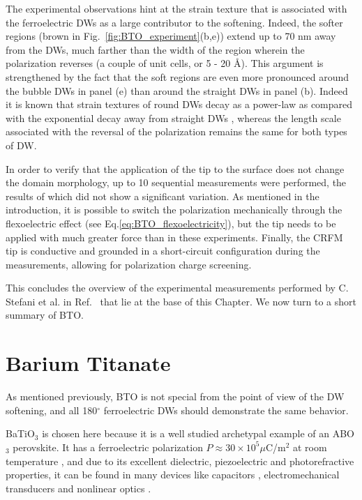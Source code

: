 The experimental observations hint at the strain texture that is associated with the ferroelectric DWs as a large contributor to the softening.
Indeed, the softer regions (brown in Fig.~\ref{fig:BTO_experiment}(b,e)) extend up to 70 nm away from the DWs, much farther than the width of the region wherein the polarization reverses (a couple of unit cells, or 5 - 20 \AA \cite{Zhirnov1959}).
This argument is strengthened by the fact that the soft regions are even more pronounced around the bubble DWs in panel (e) than around the straight DWs in panel (b).
Indeed it is known that strain textures of round DWs decay as a power-law as compared with the exponential decay away from straight DWs \cite{Landau1960}, whereas the length scale associated with the reversal of the polarization remains the same for both types of DW.

In order to verify that the application of the tip to the surface does not change the domain morphology, up to 10 sequential measurements were performed, the results of which did not show a significant variation.
As mentioned in the introduction, it is possible to switch the polarization mechanically through the flexoelectric effect (see Eq.\ref{eq:BTO_flexoelectricity}), but the tip needs to be applied with much greater force than in these experiments.
Finally, the CRFM tip is conductive and grounded in a short-circuit configuration during the measurements, allowing for polarization charge screening.

This concludes the overview of the experimental measurements performed by C. Stefani et al. in Ref.~\cite{Stefani2020} that lie at the base of this Chapter.
We now turn to a short summary of BTO.

\section{Barium Titanate}
As mentioned previously, BTO is not special from the point of view of the DW softening, and all 180$^\circ$ ferroelectric DWs should demonstrate the same behavior.

BaTiO$_3$ is chosen here because it is a well studied archetypal example of an ABO$_3$ perovskite.
It has a ferroelectric polarization $P \approx 30 \times 10^5 \mu $C/m$^2$ at room temperature \cite{Mason1948, VonHippel1950, Ghosez1994}, and due to its excellent dielectric, piezoelectric and photorefractive properties, it can be found in many devices like capacitors \cite{American1963}, electromechanical transducers \cite{Schofield1957} and nonlinear optics \cite{Ramakanth2015}.

